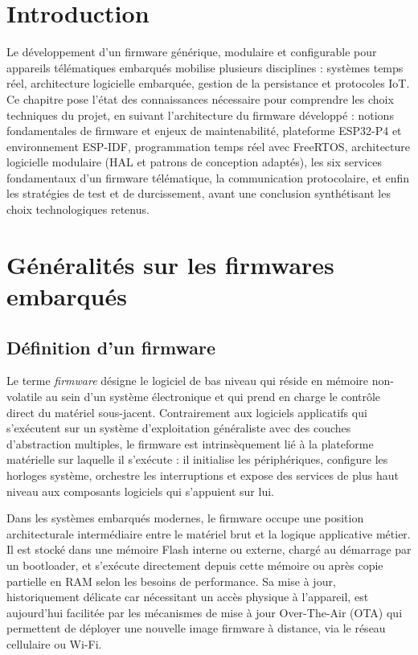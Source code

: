 \section{Introduction}
\label{sec:intro_ch2}
Le développement d'un firmware générique, modulaire et configurable pour appareils télématiques embarqués mobilise plusieurs disciplines : systèmes temps réel, architecture logicielle embarquée, gestion de la persistance et protocoles IoT. Ce chapitre pose l'état des connaissances nécessaire pour comprendre les choix techniques du projet, en suivant l'architecture du firmware développé : notions fondamentales de firmware et enjeux de maintenabilité, plateforme ESP32-P4 et environnement ESP-IDF, programmation temps réel avec FreeRTOS, architecture logicielle modulaire (HAL et patrons de conception adaptés), les six services fondamentaux d'un firmware télématique, la communication protocolaire, et enfin les stratégies de test et de durcissement, avant une conclusion synthétisant les choix technologiques retenus.

\section{Généralités sur les firmwares embarqués}
\label{sec:generalites}

\subsection{Définition d'un firmware}
\label{subsec:def_fw}

Le terme \textit{firmware} désigne le logiciel de bas niveau qui réside en
mémoire non-volatile au sein d'un système électronique et qui prend en charge
le contrôle direct du matériel sous-jacent. Contrairement aux logiciels
applicatifs qui s'exécutent sur un système d'exploitation généraliste avec
des couches d'abstraction multiples, le firmware est intrinsèquement lié à
la plateforme matérielle sur laquelle il s'exécute : il initialise les
périphériques, configure les horloges système, orchestre les interruptions
et expose des services de plus haut niveau aux composants logiciels qui
s'appuient sur lui.

Dans les systèmes embarqués modernes, le firmware occupe une position
architecturale intermédiaire entre le matériel brut et la logique applicative
métier. Il est stocké dans une mémoire Flash interne ou externe, chargé au
démarrage par un bootloader, et s'exécute directement depuis cette mémoire
ou après copie partielle en RAM selon les besoins de performance. Sa mise à
jour, historiquement délicate car nécessitant un accès physique à l'appareil,
est aujourd'hui facilitée par les mécanismes de mise à jour Over-The-Air
(OTA) qui permettent de déployer une nouvelle image firmware à distance, via
le réseau cellulaire ou Wi-Fi.

